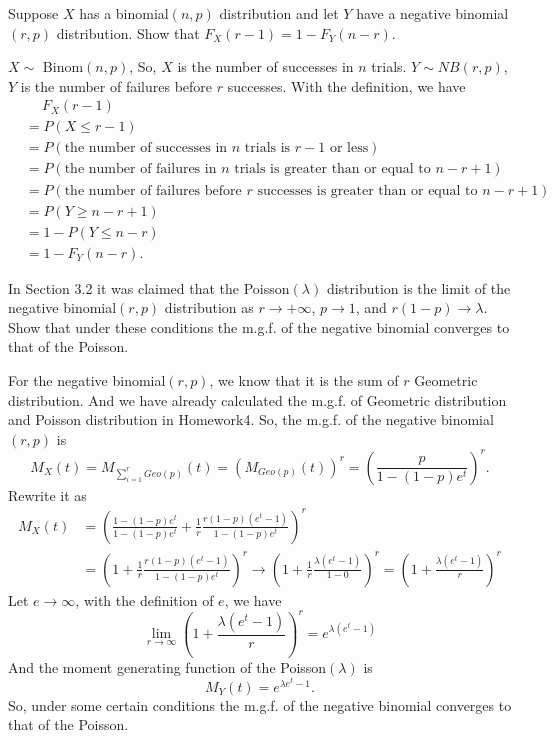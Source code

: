 \documentclass[14pt]{elegantbook}
\begin{document}
    \setcounter{exer}{11}
    \begin{exercise}
        Suppose $X$ has a binomial$(n,p)$ distribution and let $Y$ have a negative binomial$(r,p)$ distribution. Show that $F_X(r - 1)= 1- F_Y(n - r)$. 
    \end{exercise}
    \begin{solution}
        $X\sim$ Binom$(n,p)$, So, $X$ is the number of successes in $n$ trials. $Y\sim NB(r,p)$, $Y$ is the number of failures before $r$ successes. 
        With the definition, we have
        \begin{align*}
            &\quad\ F_X(r-1)\\
            &=P(X\leq r-1)\\
            &=P(\text{the number of successes in $n$ trials is $r-1$ or less})\\
            &=P(\text{the number of failures in $n$ trials is greater than or equal to $n-r+1$})\\
            &=P(\text{the number of failures before $r$ successes is greater than or equal to $n-r+1$})\\
            &=P(Y\geq n-r+1)\\
            &=1-P(Y\leq n-r)\\
            &=1-F_Y(n-r). 
        \end{align*}
    \end{solution}

    \setcounter{exer}{14}
    \begin{exercise}
        In Section 3.2 it was claimed that the Poisson$(\lambda)$ distribution is the limit of the negative binomial$(r,p)$ distribution as $r\to +\infty$, $p \to1$, and $r(1-p)\to \lambda$. Show that under these conditions the m.g.f. of the negative binomial converges to that of the Poisson. 
    \end{exercise}
    \begin{solution}
        For the negative binomial$(r,p)$, we know that it is the sum of $r$ Geometric distribution. And we have already calculated the m.g.f. of Geometric distribution and Poisson distribution in Homework4. So, the m.g.f. of the negative binomial$(r,p)$ is
        \[M_X(t)=M_{\sum_{i=1}^{r}Geo(p)}(t)=\left(M_{Geo(p)}(t)\right)^r=\left(\frac{p}{1-(1-p)e^t}\right)^r. \]
        Rewrite it as
        \begin{align*}
            M_X(t)&=\left(\frac{1-(1-p)e^t}{1-(1-p)e^t}+\frac{1}{r}\frac{r(1-p)(e^t-1)}{1-(1-p)e^t}\right)^r\\
            &=\left(1+\frac{1}{r}\frac{r(1-p)(e^t-1)}{1-(1-p)e^t}\right)^r\to\left(1+\frac{1}{r}\frac{\lambda(e^t-1)}{1-0}\right)^r=\left(1+\frac{\lambda (e^t-1)}{r}\right)^r
        \end{align*}
        Let $e\to\infty$, with the definition of $e$, we have
        \[\lim_{r\to\infty}\left(1+\frac{\lambda (e^t-1)}{r}\right)^r=e^{\lambda(e^t-1)}\]
        And the moment generating function of the Poisson$(\lambda)$ is
        \[M_Y(t)=e^{\lambda e^{t}-1}. \]
        So, under some certain conditions the m.g.f. of the negative binomial converges to that of the Poisson. 
    \end{solution}
\end{document}
